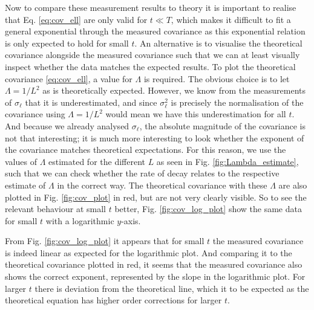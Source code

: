 Now to compare these measurement results to theory it is important to realise that Eq. \eqref{eq:cov_ell} are only valid for $t \ll T$, which makes it difficult to fit a general exponential through the measured covariance as this exponential relation is only expected to hold for small $t$.
An alternative is to visualise the theoretical covariance alongside the measured covariance such that we can at least visually inspect whether the data matches the expected results.
To plot the theoretical covariance \eqref{eq:cov_ell}, a value for $\Lambda$ is required.
The obvious choice is to let $\Lambda = 1/L^2$ as is theoretically expected.
However, we know from the measurements of $\sigma_\ell$ that it is underestimated, and since $\sigma_\ell^2$ is precisely the normalisation of the covariance using $\Lambda = 1/L^2$ would mean we have this underestimation for all $t$.
And because we already analysed $\sigma_\ell$, the absolute magnitude of the covariance is not that interesting; it is much more interesting to look whether the exponent of the covariance matches theoretical expectations.
For this reason, we use the values of $\Lambda$ estimated for the different $L$ as seen in Fig. \ref{fig:Lambda_estimate}, such that we can check whether the rate of decay relates to the respective estimate of $\Lambda$ in the correct way.
The theoretical covariance with these $\Lambda$ are also plotted in Fig. \ref{fig:cov_plot} in red, but are not very clearly visible.
So to see the relevant behaviour at small $t$ better, Fig. \ref{fig:cov_log_plot} show the same data for small $t$ with a logarithmic $y$-axis.

From Fig. \ref{fig:cov_log_plot} it appears that for small $t$ the measured covariance is indeed linear as expected for the logarithmic plot. And comparing it to the theoretical covariance plotted in red, it seems that the measured covariance also shows the correct exponent, represented by the slope in the logarithmic plot.
For larger $t$ there is deviation from the theoretical line, which it to be expected as the theoretical equation has higher order corrections for larger $t$.


